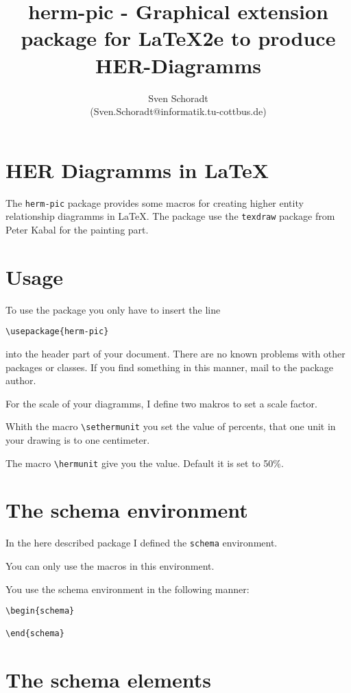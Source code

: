 \documentclass[a4paper,11pt]{article}
\author{Sven Schoradt \\ (Sven.Schoradt@informatik.tu-cottbus.de)}
\title{herm-pic - Graphical extension package for LaTeX2e to produce HER-Diagramms}
\begin{document}
\maketitle

\section{HER Diagramms in LaTeX}

The {\tt herm-pic} package provides some macros for creating higher entity relationship
diagramms in LaTeX. The package use the {\tt texdraw} package from Peter Kabal for the 
painting part.

\section{Usage}

To use the package you only have to insert the line

\begin{verbatim}
\usepackage{herm-pic}
\end{verbatim}

into the header part of your document. There are no known problems with other
packages or classes. If you find something in this manner, mail to the package author.

For the scale of your diagramms, I define two makros to set a scale factor.

Whith the macro \verb|\sethermunit| you set the value of percents, that one unit in your drawing 
is to one centimeter.

The macro \verb|\hermunit| give you the value. Default it is set to 50\%.

\section{The schema environment}

In the here described package I defined the {\tt schema} environment.

You can only use the macros in this environment.

You use the schema environment in the following manner:

\begin{verbatim}
\begin{schema}

\end{schema}
\end{verbatim}

\section{The schema elements}
\end{document}
